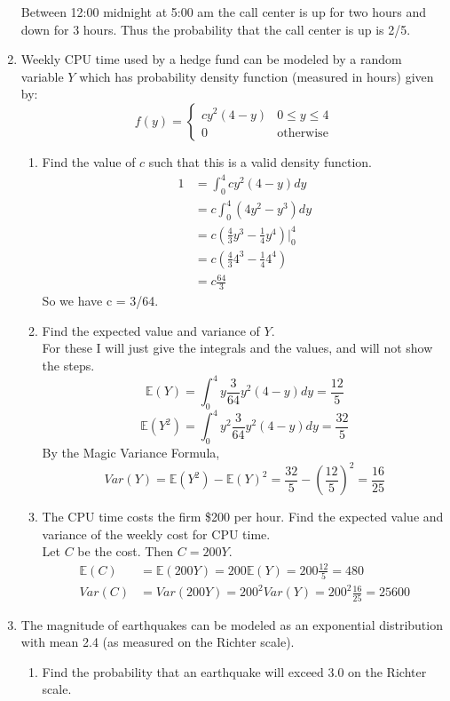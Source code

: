 \documentclass[12pt]{article}
\def\E{{\mathbb E}}
\begin{document}
\begin{enumerate}
Between 12:00 midnight at 5:00 am the call center is up for two hours and down for 3 hours. Thus the probability that the call center is up is 2/5.

\item Weekly CPU time used by a hedge fund can be modeled by a random variable $Y$ which has probability density function (measured in hours) given by:
\[
f(y) = \begin{cases}
c y^2(4-y) & 0 \leq y \leq 4 \\
0 & \text{otherwise}
\end{cases}
\]
\begin{enumerate}
\item Find the value of $c$ such that this is a valid density function.\\

\begin{align*}
1 &= \int_0^4 c y^2(4 - y) dy\\
&= c \int_0^4 (4 y^2 - y^3) dy\\
&= c \left( \frac{4}{3}y^3 - \frac{1}{4}y^4 \right)\Bigr|_0^4\\
&= c \left( \frac{4}{3}4^3 - \frac{1}{4}4^4 \right)\\
&= c \frac{64}{3}
\end{align*}
So we have c = 3/64.

\item Find the expected value and variance of $Y$.\\

For these I will just give the integrals and the values, and will not show the steps.
\[
\E(Y) = \int_0^4 y \frac{3}{64} y^2(4 - y)dy = \frac{12}{5}
\]
\[
\E(Y^2) = \int_0^4 y^2 \frac{3}{64} y^2(4 - y)dy = \frac{32}{5}
\]
By the Magic Variance Formula,
\[
Var(Y) = \E(Y^2) - \E(Y)^2 = \frac{32}{5} - \left( \frac{12}{5} \right)^2 = \frac{16}{25}
\]
\item The CPU time costs the firm \$200 per hour. Find the expected value and variance of the weekly cost for CPU time.\\

Let $C$ be the cost. Then $C = 200Y$.
\begin{align*}
\E(C) &= \E(200 Y) = 200 \E(Y) = 200 \frac{12}{5} = 480\\
Var(C) &= Var(200 Y) = 200^2 Var(Y) = 200^2 \frac{16}{25} = 25600
\end{align*}
\end{enumerate}

\item The magnitude of earthquakes can be modeled as an exponential distribution with mean 2.4 (as measured on the Richter scale). 
\begin{enumerate}
\item Find the probability that an earthquake will exceed 3.0 on the Richter scale.\\


\end{enumerate}
\end{enumerate}
\end{document}
